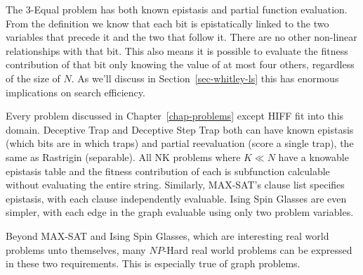 The 3-Equal problem has both known epistasis and partial function evaluation. From the definition
we know that each bit is epistatically linked to the two variables that precede it and the two
that follow it. There are no other non-linear relationships with that bit. This also means
it is possible to evaluate the fitness contribution of that bit only knowing the value of at
most four others, regardless of the size of $N$. As we'll discuss in Section~\ref{sec-whitley-ls}
this has enormous implications on search efficiency.

Every problem discussed in Chapter~\ref{chap-problems} except HIFF fit into this domain. Deceptive
Trap and Deceptive Step Trap both can have known epistasis (which bits are in which traps) and
partial reevaluation (score a single trap), the same as Rastrigin (separable). All NK problems
where $K \ll N $ have a knowable epistasis table and the fitness contribution of each is subfunction
calculable without evaluating the entire string. Similarly, MAX-SAT's clause list specifies epistasis,
with each clause independently evaluable. Ising Spin Glasses are even simpler, with each edge in the
graph evaluable using only two problem variables.

Beyond MAX-SAT and Ising Spin Glasses, which are interesting real world problems unto themselves,
many $NP$-Hard real world problems can be expressed in these two requirements. This is especially true
of graph problems.

